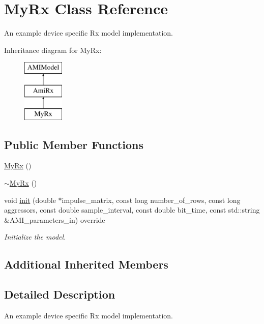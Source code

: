 \hypertarget{class_my_rx}{}\section{My\+Rx Class Reference}
\label{class_my_rx}


An example device specific Rx model implementation.  


Inheritance diagram for My\+Rx\+:\begin{figure}[H]
\begin{center}
\leavevmode
\includegraphics[height=3.000000cm]{class_my_rx}
\end{center}
\end{figure}
\subsection*{Public Member Functions}
\begin{DoxyCompactItemize}
\item 
\hyperlink{class_my_rx_a15ae23287355c2bfbdb192da7af7f043}{My\+Rx} ()
\item 
\hyperlink{class_my_rx_a7e347a66aec3f7f14f5b44659d9f98e6}{$\sim$\+My\+Rx} ()
\item 
void \hyperlink{class_my_rx_a3e517d6be1e6a475bd97ae75b2bd0afc}{init} (double $\ast$impulse\+\_\+matrix, const long number\+\_\+of\+\_\+rows, const long aggressors, const double sample\+\_\+interval, const double bit\+\_\+time, const std\+::string \&A\+M\+I\+\_\+parameters\+\_\+in) override
\begin{DoxyCompactList}\small\item\em Initialize the model. \end{DoxyCompactList}\end{DoxyCompactItemize}
\subsection*{Additional Inherited Members}


\subsection{Detailed Description}
An example device specific Rx model implementation. 

